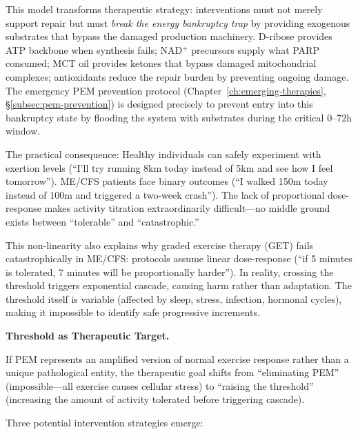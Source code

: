 This model transforms therapeutic strategy: interventions must not merely support repair but must \textit{break the energy bankruptcy trap} by providing exogenous substrates that bypass the damaged production machinery. D-ribose provides ATP backbone when synthesis fails; NAD$^+$ precursors supply what PARP consumed; MCT oil provides ketones that bypass damaged mitochondrial complexes; antioxidants reduce the repair burden by preventing ongoing damage. The emergency PEM prevention protocol (Chapter~\ref{ch:emerging-therapies}, \S\ref{subsec:pem-prevention}) is designed precisely to prevent entry into this bankruptcy state by flooding the system with substrates during the critical 0--72h window.

The practical consequence: Healthy individuals can safely experiment with exertion levels (``I'll try running 8km today instead of 5km and see how I feel tomorrow''). ME/CFS patients face binary outcomes (``I walked 150m today instead of 100m and triggered a two-week crash''). The lack of proportional dose-response makes activity titration extraordinarily difficult---no middle ground exists between ``tolerable'' and ``catastrophic.''

This non-linearity also explains why graded exercise therapy (GET) fails catastrophically in ME/CFS: protocols assume linear dose-response (``if 5 minutes is tolerated, 7 minutes will be proportionally harder''). In reality, crossing the threshold triggers exponential cascade, causing harm rather than adaptation. The threshold itself is variable (affected by sleep, stress, infection, hormonal cycles), making it impossible to identify safe progressive increments.

\textbf{Threshold as Therapeutic Target.}

If PEM represents an amplified version of normal exercise response rather than a unique pathological entity, the therapeutic goal shifts from ``eliminating PEM'' (impossible---all exercise causes cellular stress) to ``raising the threshold'' (increasing the amount of activity tolerated before triggering cascade).

Three potential intervention strategies emerge:

